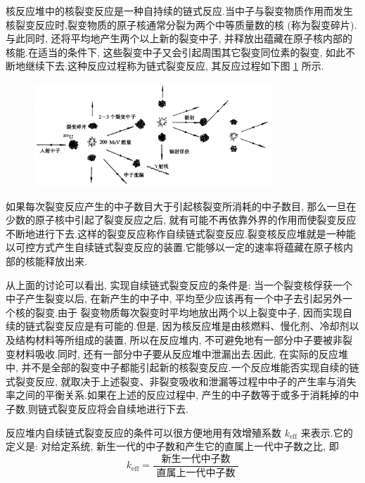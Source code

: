\documentclass{Sichuan Normal University}
\begin{document}
核反应堆中的核裂变反应是一种自持续的链式反应.当中子与裂变物质作用而发生核裂变反应时,裂变物质的原子核通常分裂为两个中等质量数的核 (称为裂变碎片).与此同时, 还将平均地产生两个以上新的裂变中子, 并释放出蕴藏在原子核内部的核能.在适当的条件下, 这些裂变中子又会引起周围其它裂变同位素的裂变, 如此不断地继续下去.这种反应过程称为链式裂变反应, 其反应过程如下图 \ref{fig:链式裂变反应} 所示.
\begin{figure}[H]
    \centering
    \includegraphics[width=0.8\textwidth]{./figure/链式裂变反应示意图.png}
    \label{fig:链式裂变反应}
    \end{figure}
如果每次裂变反应产生的中子数目大于引起核裂变所消耗的中子数目, 那么一旦在少数的原子核中引起了裂变反应之后, 就有可能不再依靠外界的作用而使裂变反应不断地进行下去.这样的裂变反应称作自续链式裂变反应.裂变核反应堆就是一种能以可控方式产生自续链式裂变反应的装置.它能够以一定的速率将蕴藏在原子核内部的核能释放出来.

从上面的讨论可以看出, 实现自续链式裂变反应的条件是: 当一个裂变核俘获一个中子产生裂变以后, 在新产生的中子中, 平均至少应该再有一个中子去引起另外一个核的裂变.由于
裂变物质每次裂变时平均地放出两个以上裂变中子, 因而实现自续的链式裂变反应是有可能的.但是, 因为核反应堆是由核燃料、慢化剂、冷却剂以及结构材料等所组成的装置, 所以在反应堆内, 不可避免地有一部分中子要被非裂变材料吸收.同时, 还有一部分中子要从反应堆中泄漏出去.因此, 在实际的反应堆中, 并不是全部的裂变中子都能引起新的核裂变反应.一个反应堆能否实现自续的链式裂变反应, 就取决于上述裂变、非裂变吸收和泄漏等过程中中子的产生率与消失率之间的平衡关系.如果在上述的反应过程中, 产生的中子数等于或多于消耗掉的中子数,则链式裂变反应将会自续地进行下去.

反应堆内自续链式裂变反应的条件可以很方便地用有效增殖系数 $k_{\mathrm{eff}}$ 来表示.它的定义是: 对给定系统, 新生一代的中子数和产生它的直属上一代中子数之比, 即
\begin{equation}
    k_{\mathrm{eff}}=\frac{\text { 新生一代中子数 }}{\text { 直属上一代中子数 }}
    \label{eq:有效增殖系数}
\end{equation}
\end{document}
